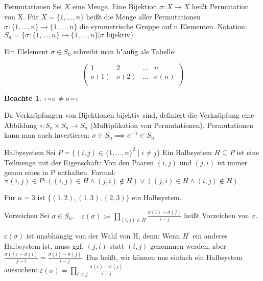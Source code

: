 \documentclass[oneside,fontsize=11pt,paper=a4,BCOR=0mm,DIV=12,automark,headsepline]{scrbook}
\theoremstyle{remark}
\theoremstyle{definition}
\newtheorem*{notte}{Beachte}
\theoremstyle{definition}
\theoremstyle{remark}
\begin{document}
\begin{definition}{Permutationen}{}
  Sei $X$ eine Menge. Eine Bijektion $\sigma: X \to X$ heißt Permutation
  von X. \newline
  Für \(X = \{1,...,n\}\) heißt die Menge aller Permutationen \(\sigma: \{1,...,n\}\to\{1,...,n\}\) die symmetrische Gruppe auf n Elementen. Notation: \(S_n = \{ \sigma: \{1,...,n\}\to\{1,...,n\}|\sigma\text{ bijektiv}\}\)
\end{definition}

\begin{exa}
  Ein Elelement \(\sigma \in S_n\) schreibt man h"aufig als Tabelle:
  
  \[
    \left(
      \begin{array}{cccc}
        1 & 2 & ... & n\\
        \sigma(1) & \sigma(2) & ... & \sigma(n)\\
      \end{array}\right)
  \]
\end{exa}

\begin{notte}
  $\tau\circ\sigma \not= \sigma\circ\tau$
\end{notte}

Da Verknüpfungen von Bijektionen bijektiv sind, definiert die Verknüpfung eine Abbildung \(\circ: S_n \times S_n \to S_n \) (Multiplikation von Permutationen). Permutationen kann man auch invertieren: \(\sigma \in S_n \implies \sigma^{-1} \in S_n \)

\begin{definition}{Halbysystem}{}
  Sei \(P=\{(i,j) \in \{1,...,n\}^2\mid i\neq j \} \) Ein Halbsystem \(H \subseteq P \) ist eine Teilmenge mit der Eigenschaft: Von den Paaren \((i,j) \) und \((j,i) \) ist immer genau eines in P enthalten. Formal:
  \(\forall (i,j) \in P: ((i,j) \in H \land (j,i) \notin H) \lor ((j,i) \in H \land (i,j) \notin H )\)
\end{definition}

\begin{exa}
  Für \(n=3 \) ist \(\{(1,2), (1,3), (2,3)\} \) ein Halbsystem.
\end{exa}

\begin{definition}{Vorzeichen}{}
  Sei \(\sigma \in S_n. \quad \varepsilon(\sigma):= \prod\limits_{(i,j)\in H} \frac{\sigma(i)-\sigma(j)}{i-j} \) heißt Vorzeichen von \(\sigma \).
\end{definition}

\(\varepsilon(\sigma) \) ist unabhängig von der Wahl von H, denn: Wenn \(H^\prime \) ein anderes Halbsystem ist, muss ggf. \((j,i) \) statt \((i,j) \) genommen werden, aber \(\frac{\sigma(j)-\sigma(i)}{j-i} = \frac{\sigma(i)-\sigma(j)}{i-j} \).
Das heißt, wir können uns einfach ein Halbsystem aussuchen:
\(\varepsilon(\sigma) = \prod\limits_{i<j}\frac{\sigma(i)-\sigma(j)}{i-j} \)
\end{document}
